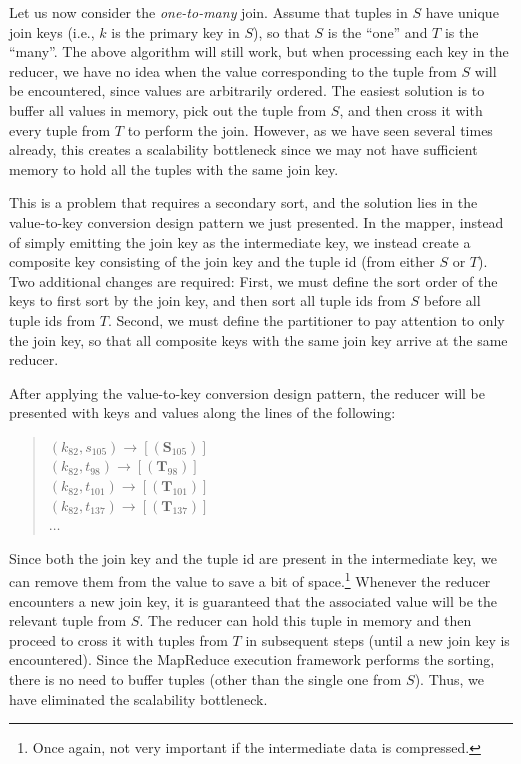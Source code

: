 Let us now consider the {\it one-to-many} join.  Assume that tuples in
$S$ have unique join keys (i.e., $k$ is the primary key in $S$), so
that $S$ is the ``one'' and $T$ is the ``many''.  The above algorithm
will still work, but when processing each key in the reducer, we have
no idea when the value corresponding to the tuple from $S$ will be
encountered, since values are arbitrarily ordered.  The easiest
solution is to buffer all values in memory, pick out the tuple from
$S$, and then cross it with every tuple from $T$ to perform the join.
However, as we have seen several times already, this creates a
scalability bottleneck since we may not have sufficient memory to hold
all the tuples with the same join key.

This is a problem that requires a secondary sort, and the solution
lies in the value-to-key conversion design pattern we just presented.
In the mapper, instead of simply emitting the join key as the
intermediate key, we instead create a composite key consisting of the
join key and the tuple id (from either $S$ or $T$).  Two additional
changes are required: First, we must define the sort order of the keys
to first sort by the join key, and then sort all tuple ids from $S$
before all tuple ids from $T$.  Second, we must define the
partitioner to pay attention to only the join key, so that all
composite keys with the same join key arrive at the same reducer.

After applying the value-to-key conversion design pattern, the reducer
will be presented with keys and values along the lines of the
following:

\begin{quote}
$(k_{82}, s_{105}) \rightarrow [(\textbf{S}_{105})]$ \\
$(k_{82}, t_{98}) \rightarrow [(\textbf{T}_{98})]$ \\
$(k_{82}, t_{101}) \rightarrow [(\textbf{T}_{101})]$ \\
$(k_{82}, t_{137}) \rightarrow [(\textbf{T}_{137})]$ \\
$\ldots$
\end{quote}

\noindent Since both the join key and the tuple id are present in the
intermediate key, we can remove them from the value to save a bit of
space.\footnote{Once again, not very important if the intermediate
  data is compressed.}  Whenever the reducer encounters a new join
key, it is guaranteed that the associated value will be the relevant
tuple from $S$.  The reducer can hold this tuple in memory and then
proceed to cross it with tuples from $T$ in subsequent steps (until a
new join key is encountered).  Since the MapReduce execution framework
performs the sorting, there is no need to buffer tuples (other than
the single one from $S$).  Thus, we have eliminated the scalability
bottleneck.

